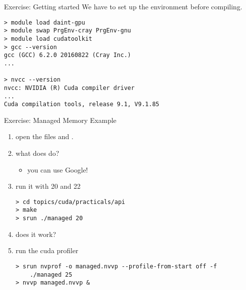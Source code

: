 \documentclass[aspectratio=43]{beamer}
\begin{document}
\begin{frame}[fragile]{Exercise: Getting started}
    We have to set up the environment before compiling.
    \begin{lstlisting}[style=terminal]
> module load daint-gpu
> module swap PrgEnv-cray PrgEnv-gnu
> module load cudatoolkit
> gcc --version
gcc (GCC) 6.2.0 20160822 (Cray Inc.)
...

> nvcc --version
nvcc: NVIDIA (R) Cuda compiler driver
...
Cuda compilation tools, release 9.1, V9.1.85
    \end{lstlisting}
\end{frame}

\begin{frame}[fragile]{Exercise: Managed Memory Example}
    \begin{enumerate}
        \item open the files  and .
        \item what does  do?
        \begin{itemize}
            \item you can use Google!
        \end{itemize}
        \item run it with 20 and 22
    \begin{terminal}{}
    \begin{lstlisting}[style=terminal]
> cd topics/cuda/practicals/api
> make
> srun ./managed 20
    \end{lstlisting}
    \end{terminal}
        \item does it work?
        \item run the cuda profiler
        \begin{terminal}{}
            \begin{lstlisting}[style=terminal]
> srun nvprof -o managed.nvvp --profile-from-start off -f
    ./managed 25
> nvvp managed.nvvp &
            \end{lstlisting}
        \end{terminal}
    \end{enumerate}
\end{frame}
\end{document}
